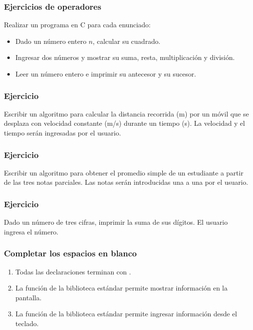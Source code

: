 \begin{ejercicioClase}
    \subsubsection{Ejercicios de operadores}
    Realizar un programa en C para cada enunciado:
    \begin{itemize}
          \item Dado un número entero \( n \), calcular su cuadrado.
          \item Ingresar dos números y mostrar su suma, resta, multiplicación y división.
          \item Leer un número entero e imprimir su antecesor y su sucesor.
    \end{itemize}

    \subsubsection{Ejercicio}
    Escribir un algoritmo para calcular la distancia recorrida (m) por un móvil que se desplaza con velocidad constante (m/s) durante un tiempo (s).
    La velocidad y el tiempo serán ingresadas por el usuario.

    \subsubsection{Ejercicio}
    Escribir un algoritmo para obtener el promedio simple de un estudiante a partir de las tres notas parciales.
    Las notas serán introducidas una a una por el usuario.

    \subsubsection{Ejercicio}
    Dado un número de tres cifras, imprimir la suma de sus dígitos. El usuario ingresa el número.

\end{ejercicioClase}


\subsubsection{Completar los espacios en blanco}
\begin{enumerate}
  \item Todas las declaraciones terminan con \underspace.
  \item La función \underspace de la biblioteca estándar permite mostrar información en la pantalla.
  \item La función \underspace de la biblioteca estándar permite ingresar información desde el teclado.
\end{enumerate}
    
